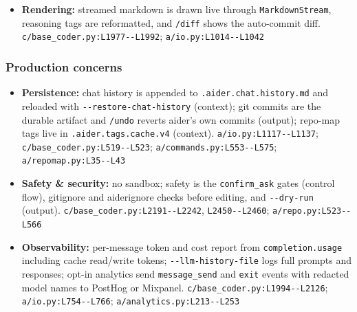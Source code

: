 \begin{itemize}
\item \textbf{Rendering:} streamed markdown is drawn live through \texttt{MarkdownStream}, reasoning tags are reformatted, and \texttt{/\allowbreak{}diff} shows the auto-commit diff. \texttt{c/\allowbreak{}base\_\allowbreak{}coder.\allowbreak{}py:\allowbreak{}L1977-\allowbreak{}-\allowbreak{}L1992}; \texttt{a/\allowbreak{}io.\allowbreak{}py:\allowbreak{}L1014-\allowbreak{}-\allowbreak{}L1042}
\end{itemize}

\subsubsection*{Production concerns}
\begin{itemize}
\item \textbf{Persistence:} chat history is appended to \texttt{.\allowbreak{}aider.\allowbreak{}chat.\allowbreak{}history.\allowbreak{}md} and reloaded with \texttt{-\allowbreak{}-\allowbreak{}restore-\allowbreak{}chat-\allowbreak{}history} (context); git commits are the durable artifact and \texttt{/\allowbreak{}undo} reverts aider's own commits (output); repo-map tags live in \texttt{.\allowbreak{}aider.\allowbreak{}tags.\allowbreak{}cache.\allowbreak{}v4} (context). \texttt{a/\allowbreak{}io.\allowbreak{}py:\allowbreak{}L1117-\allowbreak{}-\allowbreak{}L1137}; \texttt{c/\allowbreak{}base\_\allowbreak{}coder.\allowbreak{}py:\allowbreak{}L519-\allowbreak{}-\allowbreak{}L523}; \texttt{a/\allowbreak{}commands.\allowbreak{}py:\allowbreak{}L553-\allowbreak{}-\allowbreak{}L575}; \texttt{a/\allowbreak{}repomap.\allowbreak{}py:\allowbreak{}L35-\allowbreak{}-\allowbreak{}L43}
\item \textbf{Safety \& security:} no sandbox; safety is the \texttt{confirm\_\allowbreak{}ask} gates (control flow), gitignore and aiderignore checks before editing, and \texttt{-\allowbreak{}-\allowbreak{}dry-\allowbreak{}run} (output). \texttt{c/\allowbreak{}base\_\allowbreak{}coder.\allowbreak{}py:\allowbreak{}L2191-\allowbreak{}-\allowbreak{}L2242}, \texttt{L2450-\allowbreak{}-\allowbreak{}L2460}; \texttt{a/\allowbreak{}repo.\allowbreak{}py:\allowbreak{}L523-\allowbreak{}-\allowbreak{}L566}
\item \textbf{Observability:} per-message token and cost report from \texttt{completion.\allowbreak{}usage} including cache read/write tokens; \texttt{-\allowbreak{}-\allowbreak{}llm-\allowbreak{}history-\allowbreak{}file} logs full prompts and responses; opt-in analytics send \texttt{message\_\allowbreak{}send} and \texttt{exit} events with redacted model names to PostHog or Mixpanel. \texttt{c/\allowbreak{}base\_\allowbreak{}coder.\allowbreak{}py:\allowbreak{}L1994-\allowbreak{}-\allowbreak{}L2126}; \texttt{a/\allowbreak{}io.\allowbreak{}py:\allowbreak{}L754-\allowbreak{}-\allowbreak{}L766}; \texttt{a/\allowbreak{}analytics.\allowbreak{}py:\allowbreak{}L213-\allowbreak{}-\allowbreak{}L253}

\end{itemize}
